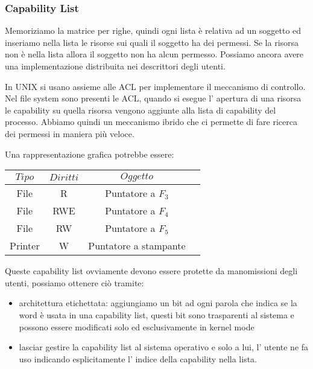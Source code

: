 \subsubsection{Capability List}
Memoriziamo la matrice per righe, quindi ogni lista è relativa ad un soggetto ed inseriamo nella lista le risorse sui quali il soggetto ha dei permessi.
Se la risorsa non è nella lista allora il soggetto non ha alcun permesso.
Possiamo ancora avere una implementazione distribuita nei descrittori degli utenti.

In UNIX si usano assieme alle ACL per implementare il meccanismo di controllo.
Nel file system sono presenti le ACL, quando si esegue l' apertura di una risorsa le capability su quella risorsa vengono aggiunte alla lista di capability del processo.
Abbiamo quindi un meccanismo ibrido che ci permette di fare ricerca dei permessi in maniera più veloce.

Una rappresentazione grafica potrebbe essere:
\begin{table}[H]
    \centering
    \begin{tabular}{c|c|c|c}
        $Tipo$ & $Diritti$ & $Oggetto$  \\
        \hline
        File & R & Puntatore a $F_3$ \\
        File & RWE & Puntatore a $F_4$ \\
        File & RW & Puntatore a $F_5$ \\
        Printer & W & Puntatore a stampante \\
    \end{tabular}
\end{table}

Queste capability list ovviamente devono essere protette da manomissioni degli utenti, possiamo ottenere ciò tramite:
\begin{itemize}
    \item architettura etichettata: aggiungiamo un bit ad ogni parola che indica se la word è usata in una capability list, questi bit sono trasparenti al sistema e possono essere modificati solo ed esclusivamente in kernel mode
    
    \item lasciar gestire la capability list al sistema operativo e solo a lui, l' utente ne fa uso indicando esplicitamente l' indice della capability nella lista.
\end{itemize}

